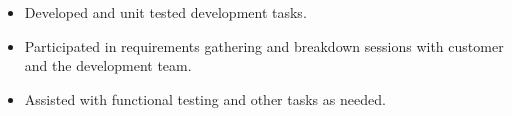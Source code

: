 \documentclass[10pt,a4paper,ragged2e,withhyper]{altacv}
\begin{document}
\divider

\begin{itemize}
\item Developed and unit tested development tasks.
\item Participated in requirements gathering and breakdown sessions with customer and the development team.
\item Assisted with functional testing and other tasks as needed.
\end{itemize}




















\end{document}
